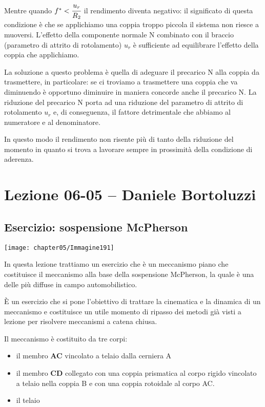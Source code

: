 Mentre quando $f^* < \cfrac{u_r}{R_2}$ il rendimento diventa negativo: il significato di questa condizione è che se applichiamo una coppia troppo piccola il sistema non riesce a muoversi.
L'effetto della componente normale N combinato con il braccio (parametro di attrito di rotolamento) $u_r$ è sufficiente ad equilibrare l'effetto della coppia che applichiamo.

La soluzione a questo problema è quella di adeguare il precarico N alla coppia da trasmettere, in particolare: se ci troviamo a trasmettere una coppia che va diminuendo è opportuno diminuire in maniera concorde anche il precarico N. La riduzione del precarico N porta ad una riduzione del parametro di attrito di rotolamento $u_r$ e, di conseguenza, il fattore detrimentale che abbiamo al numeratore e al denominatore.

In questo modo il rendimento non risente più di tanto della riduzione del momento in quanto si trova a lavorare sempre in prossimità della condizione di aderenza.

\section{Lezione 06-05 -- Daniele Bortoluzzi}

\subsection{Esercizio: sospensione McPherson}

\begin{minipage}{.5\textwidth}
\centering
\texttt{[image: chapter05/Immagine191]}
\end{minipage}
\hfill
\begin{minipage}{.5\textwidth}

In questa lezione trattiamo un esercizio che è un meccanismo piano che costituisce il meccanismo alla base della sospensione McPherson, la quale è una delle più diffuse in campo automobilistico.

È un esercizio che si pone l'obiettivo di trattare la cinematica e la dinamica di un meccanismo e costituisce un utile momento di ripasso dei metodi già visti a lezione per risolvere meccanismi a catena chiusa.

Il meccanismo è costituito da tre corpi:
\begin{itemize}
\item il membro \textbf{AC} vincolato a telaio dalla cerniera A
\item il membro \textbf{CD} collegato con una coppia prismatica al corpo rigido vincolato a telaio nella coppia B e con una coppia rotoidale al corpo AC.
\item il telaio
\end{itemize}
\end{minipage}

